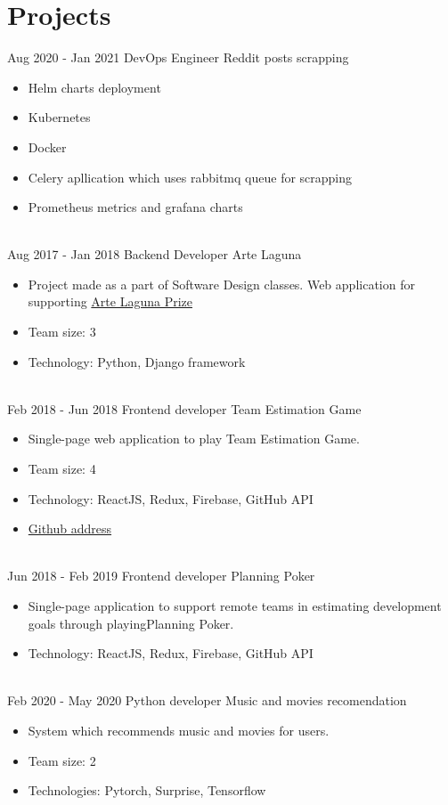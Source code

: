 \documentclass[letterpaper]{tenseconds} %
\begin{document}
\section{Projects}

\begin{twenty} %
	\twentyitem
	{Aug 2020 -}
	{Jan 2021}
	{DevOps Engineer}
	{Reddit posts scrapping}
	{}
	{\begin{itemize}
		\item Helm charts deployment
		\item Kubernetes
		\item Docker
		\item Celery apllication which uses rabbitmq queue for scrapping
		\item Prometheus metrics and grafana charts
		\end{itemize}}
	\\
	\twentyitem
	{Aug 2017 -}
	{Jan 2018}
	{Backend Developer}
	{Arte Laguna}
	{}
	{\begin{itemize}
		\item Project made as a part of Software Design classes. Web application for supporting {\href{https://github.com/kk0walski/konkurs}{Arte Laguna Prize}}
		\item Team size: 3
		\item Technology: Python, Django framework
		\end{itemize}}
	\\
	\twentyitem
	{Feb 2018 -}
	{Jun 2018}
	{Frontend developer}
	{Team Estimation Game}
	{}
	{\begin{itemize}
		\item Single-page web application to play Team Estimation Game.
		\item Team size: 4
		\item Technology: ReactJS, Redux, Firebase, GitHub API
		\item {\href{https://www.github.com/kk0walski/reactiveTeamEstimationGame}{Github address}}
		\end{itemize}}
	\\
	\twentyitem
	{Jun 2018 -}
	{Feb 2019}
	{Frontend developer}
	{Planning Poker}
	{}
	{\begin{itemize}
		\item Single-page application to support remote teams in estimating development goals through playingPlanning Poker.
		\item Technology: ReactJS, Redux, Firebase, GitHub API
		\end{itemize}}
	\\
	\twentyitem
	{Feb 2020 -}
	{May 2020}
	{Python developer}
	{Music and movies recomendation}
	{}
	{\begin{itemize}
		\item System which recommends music and movies for users.
		\item Team size: 2
		\item Technologies: Pytorch, Surprise, Tensorflow
		\end{itemize}}
\end{twenty}
\end{document}
